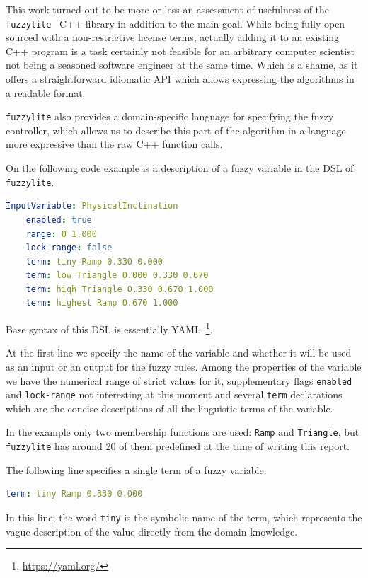 \documentclass[12pt, a4paper]{report}
\begin{document}
	This work turned out to be more or less an assessment of usefulness of the \texttt{fuzzylite}~\cite{fl::fuzzylite} C++ library in addition to the main goal.
	While being fully open sourced with a non-restrictive license terms, actually adding it to an existing C++ program is a task certainly not feasible for an arbitrary computer scientist not being a seasoned software engineer at the same time.
	Which is a shame, as it offers a straightforward idiomatic API which allows expressing the algorithms in a readable format.

	\texttt{fuzzylite} also provides a domain-specific language for specifying the fuzzy controller, which allows us to describe this part of the algorithm in a language more expressive than the raw C++ function calls.

  On the following code example is a description of a fuzzy variable in the DSL of \texttt{fuzzylite}.

  \begin{lstlisting}[language=yaml]
  InputVariable: PhysicalInclination
    enabled: true
    range: 0 1.000
    lock-range: false
    term: tiny Ramp 0.330 0.000
    term: low Triangle 0.000 0.330 0.670
    term: high Triangle 0.330 0.670 1.000
    term: highest Ramp 0.670 1.000
  \end{lstlisting}

  Base syntax of this DSL is essentially YAML~\footnote{\url{https://yaml.org/}}.

  At the first line we specify the name of the variable and whether it will be used as an input or an output for the fuzzy rules.
  Among the properties of the variable we have the numerical range of strict values for it, supplementary flags \texttt{enabled} and \texttt{lock-range} not interesting at this moment
  and several \texttt{term} declarations which are the concise descriptions of all the linguistic terms of the variable.

  In the example only two membership functions are used: \texttt{Ramp} and \texttt{Triangle}, but \texttt{fuzzylite} has around 20 of them predefined at the time of writing this report.
  
  The following line specifies a single term of a fuzzy variable:
  
  \begin{lstlisting}[language=yaml]
  	term: tiny Ramp 0.330 0.000
  \end{lstlisting}
  
  In this line, the word \texttt{tiny} is the symbolic name of the term, which represents the vague description of the value directly from the domain knowledge.
  
\end{document}
